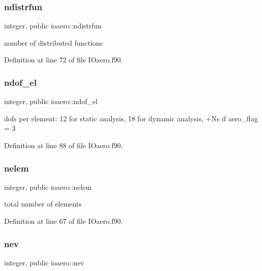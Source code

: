 \subsubsection{\texorpdfstring{ndistrfun}{ndistrfun}}
{\footnotesize\ttfamily integer, public ioaero\+::ndistrfun}



number of distributed functions 



Definition at line 72 of file I\+Oaero.\+f90.

\mbox{\label{namespaceioaero_a2b095b5cb5aab1f100d202c8004c9cb5}} 
\subsubsection{\texorpdfstring{ndof\+\_\+el}{ndof\_el}}
{\footnotesize\ttfamily integer, public ioaero\+::ndof\+\_\+el}



dofs per element\+: 12 for static analysis, 18 for dynamic analysis, +\+Ns if aero\+\_\+flag = 3 



Definition at line 88 of file I\+Oaero.\+f90.

\mbox{\label{namespaceioaero_a543ebf3623a96606d0956211621ce254}} 
\subsubsection{\texorpdfstring{nelem}{nelem}}
{\footnotesize\ttfamily integer, public ioaero\+::nelem}



total number of elements 



Definition at line 67 of file I\+Oaero.\+f90.

\mbox{\label{namespaceioaero_a1216c8699aea9eb27e3d795cc9d8d271}} 
\subsubsection{\texorpdfstring{nev}{nev}}
{\footnotesize\ttfamily integer, public ioaero\+::nev}



